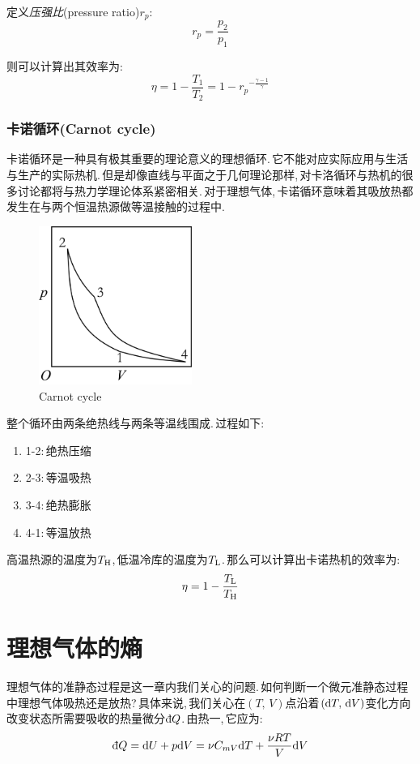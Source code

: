 定义\emph{压强比}(pressure ratio)$r_p$:
\[r_p=\frac{p_2}{p_1}\]

则可以计算出其效率为:
\[\eta=1-\frac{T_1}{T_2}=1-{r_p}^{-\frac{\gamma-1}{\gamma}}\]

\npg{-3cm}

\subsubsection{\hei 卡诺循环(Carnot cycle)}

卡诺循环是一种具有极其重要的理论意义的理想循环.\,它不能对应实际应用与生活与生产的实际热机.\,但是却像直线与平面之于几何理论那样,\,对卡洛循环与热机的很多讨论都将与热力学理论体系紧密相关.\,对于理想气体,\,卡诺循环意味着其吸放热都发生在与两个恒温热源做等温接触的过程中.
\begin{figure}
\centering
\vspace{-0.5cm}
\includegraphics[width=5cm]{image/5-2-10.png}
\caption{Carnot cycle}
\end{figure}
整个循环由两条绝热线与两条等温线围成.\,过程如下:

\begin{enumerate}[i]
	\item 1-2:\,绝热压缩
	\item 2-3:\,等温吸热
	\item 3-4:\,绝热膨胀
	\item 4-1:\,等温放热
\end{enumerate}

高温热源的温度为$T_{\rm H}$,\,低温冷库的温度为$T_{\rm L}$.\,那么可以计算出卡诺热机的效率为:
\[\eta=1-\frac{T_{\rm L}}{T_{\rm H}}\]


\section{理想气体的熵}

理想气体的准静态过程是这一章内我们关心的问题.\,如何判断一个微元准静态过程中理想气体吸热还是放热?\,具体来说,\,我们关心在$(T,\,V)$点沿着$(\textrm{d} T,\,\textrm{d} V)$变化方向改变状态所需要吸收的热量微分$\dbar Q$.\,由热一,\,它应为:
\[\dbar Q=\ud U+p\ud V=\nu C_{mV}\ud T+\frac{\nu RT}{V}\ud V\]


